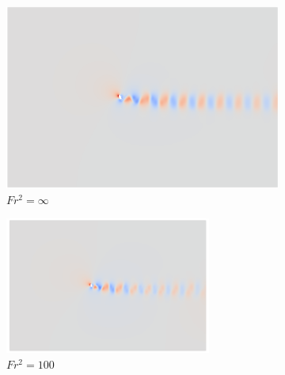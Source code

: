\begin{figure}
    \centering
    \begin{subfigure}[b]{0.32\textwidth}
        \centering
        \includegraphics[width=\textwidth]{images/spinning_ellipse/ar0p5fsinf.png}
        \caption{$Fr^2 = \infty$}
        \label{fig:ar0p5fsinf}
    \end{subfigure}
    \hfill
    \begin{subfigure}[b]{0.32\textwidth}
        \centering
        \includegraphics[width=\textwidth]{images/spinning_ellipse/ar0p5fr10.png}
        \caption{$Fr^2 = 100$}
        \label{fig:ar0p5fr10}
    \end{subfigure}
    \hfill
    \begin{subfigure}[b]{0.32\textwidth}
        \centering

\end{subfigure}
\end{figure}
